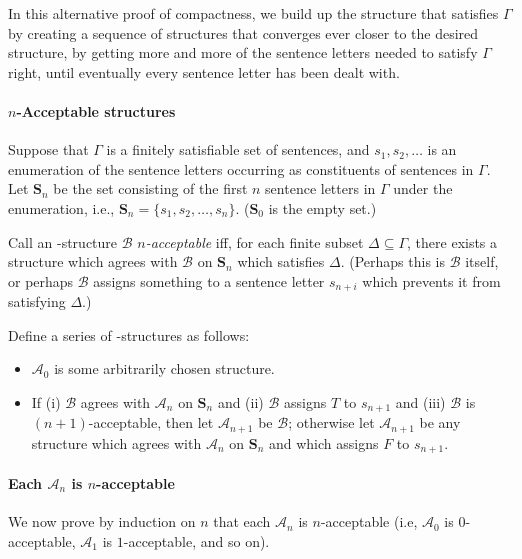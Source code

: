 In this alternative proof of compactness, we build up the structure that satisfies $\Gamma$ by creating a sequence of structures that converges ever closer to the desired structure, by getting more and more of the sentence letters needed to satisfy $\Gamma$ right, until eventually every sentence letter has been dealt with.

\paragraph{$n$-Acceptable structures}
Suppose that $\Gamma$ is a finitely satisfiable set of sentences, and $s_{1},s_{2},\ldots$ is an enumeration of the sentence letters occurring as constituents of sentences in $\Gamma$. Let $\mathbf{S}_{n}$ be the set consisting of the first $n$ sentence letters in $\Gamma$ under the enumeration, i.e., $\mathbf{S}_{n} = \{s_{1},s_{2},\ldots,s_{n}\}$. ($\mathbf{S}_{0}$ is the empty set.)
    

 Call an \lone-structure $\mathscr{B}$ \emph{$n$-acceptable} iff, for each finite subset $\Delta \subseteq \Gamma$, there exists a structure which agrees with $\mathscr{B}$ on $\mathbf{S}_{n}$ which satisfies $\Delta$. (Perhaps this is $\mathscr{B}$ itself, or perhaps $\mathscr{B}$ assigns something to a sentence letter $s_{n+i}$ which prevents it from satisfying $\Delta$.)


Define a series of \lone-structures as follows: \begin{itemize}
      \item $\mathscr{A}_{0}$ is some arbitrarily chosen structure.
      \item If (i) $\mathscr{B}$ agrees with $\mathscr{A}_{n}$ on $\mathbf{S}_{n}$ and (ii) $\mathscr{B}$ assigns $T$ to $s_{n+1}$ and (iii) $\mathscr{B}$ is $(n+1)$-acceptable, then let $\mathscr{A}_{n+1}$ be $\mathscr{B}$; otherwise let $\mathscr{A}_{n+1}$ be any structure which agrees with $\mathscr{A}_{n}$ on $\mathbf{S}_{n}$ and which assigns $F$ to $s_{n+1}$.
    \end{itemize} 
    
  \paragraph{Each $\mathscr{A}_{n}$ is $n$-acceptable}  
    
We now prove by induction on $n$ that each $\mathscr{A}_{n}$ is $n$-acceptable (i.e, $\mathscr{A}_{0}$ is $0$-acceptable, $\mathscr{A}_{1}$ is $1$-acceptable, and so on). 

